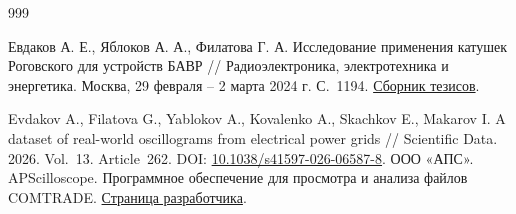\begingroup
\sloppy
\renewcommand{\bibname}{Библиографический список}
\begin{thebibliography}{999}
{}
\label{ch:bibliography}



Евдаков А. Е., Яблоков А. А., Филатова Г. А.
Исследование применения катушек Роговского для устройств БАВР //
Радиоэлектроника, электротехника и энергетика.
Москва, 29 февраля -- 2 марта 2024 г. С.~1194.
\href{https://reepe.mpei.ru/abstracts/Documents/Blok_doklad_2024_fin.pdf}{Сборник тезисов}.

Evdakov A., Filatova G., Yablokov A., Kovalenko A., Skachkov E., Makarov I.
A dataset of real-world oscillograms from electrical power grids //
Scientific Data. 2026. Vol.~13. Article~262.
DOI: \href{https://doi.org/10.1038/s41597-026-06587-8}{10.1038/s41597-026-06587-8}.
ООО «АПС». APScilloscope. Программное обеспечение
для просмотра и анализа файлов COMTRADE.
\href{https://www.aps-m.com/software}{Страница разработчика}.
\end{thebibliography}
\endgroup
